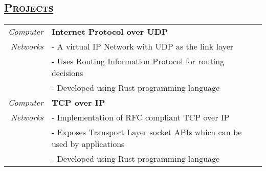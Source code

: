 \documentclass[14pt]{article}
\begin{document}
\subsection* {\scshape\large\uline {Projects}}
\begin{tabularx}{\textwidth}{r X}
\emph{Computer} & \textbf{Internet Protocol over UDP} \\
\emph{Networks} & - A virtual IP Network with UDP as the link layer\\
                             & - Uses Routing Information Protocol for routing decisions\\
                             & - Developed using Rust programming language\\

\emph{Computer} & \textbf{TCP over IP} \\
\emph{Networks} &  - Implementation of RFC compliant TCP over IP\\
                             & - Exposes Transport Layer socket APIs which can be used by applications\\
                             & - Developed using Rust programming language
\\
\end{tabularx}
\end{document}
